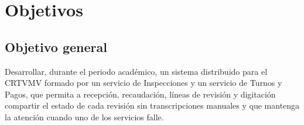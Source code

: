 \documentclass[11pt,a4paper]{article}
\begin{document}
\section{Objetivos}

\subsection{Objetivo general}
Desarrollar, durante el periodo académico, un sistema distribuido para el CRTVMV formado por un servicio de Inspecciones y un servicio de Turnos y Pagos, que permita a recepción, recaudación, líneas de revisión y digitación compartir el estado de cada revisión sin transcripciones manuales y que mantenga la atención cuando uno de los servicios falle.
\end{document}
